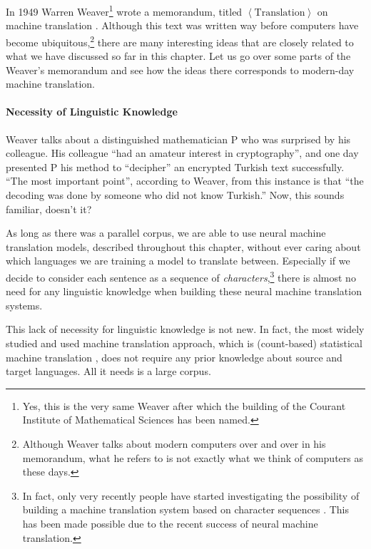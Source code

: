 \documentclass{report}
\begin{document}
In 1949 Warren Weaver\footnote{
    Yes, this is the very same Weaver after which the building of the Courant
    Institute of Mathematical Sciences has been named.
} wrote a memorandum, titled $\left<\text{Translation}\right>$ on machine
translation \cite{weaver1955translation}. Although this text was written way
before computers have become ubiquitous,\footnote{
    Although Weaver talks about modern computers over and over in his
    memorandum, what he refers to is not exactly what we think of computers as
    these days.
} there are many interesting ideas that are closely related to what we have
discussed so far in this chapter. Let us go over some parts of the Weaver's
memorandum and see how the ideas there corresponds to modern-day machine
translation.

\paragraph{Necessity of Linguistic Knowledge}

Weaver talks about a distinguished mathematician P who was surprised by his
colleague. His colleague ``had an amateur interest in cryptography'', and one
day presented P his method to ``decipher'' an encrypted Turkish text
successfully. ``The most important point'', according to Weaver, from this
instance is that ``the decoding was done by someone who did not know Turkish.''
Now, this sounds familiar, doesn't it? 

As long as there was a parallel corpus, we are able to use neural machine
translation models, described throughout this chapter, without ever caring about
which languages we are training a model to translate between.  Especially if we
decide to consider each sentence as a sequence of {\em characters},\footnote{
    In fact, only very recently people have started investigating the
    possibility of building a machine translation system based on character
    sequences \cite{ling2015character}. This has been made possible due to the
    recent success of neural machine translation.
}
there is almost no need for any linguistic knowledge when building these neural
machine translation systems. 

This lack of necessity for linguistic knowledge is not new. In fact, the most
widely studied and used machine translation approach, which is (count-based)
statistical machine translation
\cite{brown1990statistical,koehn2003statistical}, does not require any prior
knowledge about source and target languages. All it needs is a large corpus.
\end{document}

